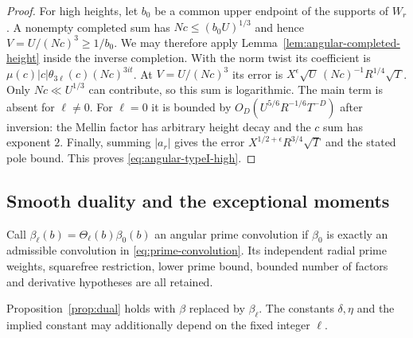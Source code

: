 \begin{proof}
For high heights, let $b_0$ be a common upper endpoint of the
supports of $W_r$. A nonempty completed sum has
$Nc\le(b_0U)^{1/3}$ and hence $V=U/(Nc)^3\ge1/b_0$.
We may therefore apply Lemma~\ref{lem:angular-completed-height}
inside the inverse completion. With the norm twist its coefficient is
$\mu(c)|c|\theta_{3\ell}(c)(Nc)^{3it}$.
At $V=U/(Nc)^3$ its error is
$X^\epsilon\sqrt U\,(Nc)^{-1}R^{1/4}\sqrt T$.
Only $Nc\ll U^{1/3}$ can contribute, so this sum is logarithmic.
The main term is absent for $\ell\ne0$. For $\ell=0$ it is bounded
by $O_D(U^{5/6}R^{-1/6}T^{-D})$ after inversion: the Mellin
factor has arbitrary height decay and the $c$ sum has exponent $2$.
Finally, summing $|a_r|$ gives the error
$X^{1/2+\epsilon}R^{3/4}\sqrt T$ and the stated pole bound.
This proves \eqref{eq:angular-typeI-high}.
\end{proof}

\subsection{Smooth duality and the exceptional moments}

Call $\beta_\ell(b)=\Theta_\ell(b)\beta_0(b)$ an angular prime
convolution if $\beta_0$ is exactly an admissible convolution in
\eqref{eq:prime-convolution}. Its independent radial prime weights,
squarefree restriction, lower prime bound, bounded number of factors
and derivative hypotheses are all retained.

\begin{proposition}
\label{prop:angular-dual}
Proposition~\ref{prop:dual} holds with $\beta$ replaced by
$\beta_\ell$. The constants $\delta,\eta$ and the implied constant
may additionally depend on the fixed integer $\ell$.
\end{proposition}


